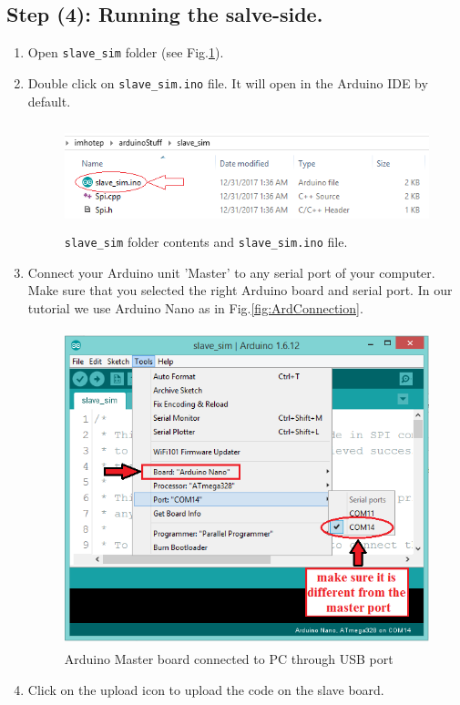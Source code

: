 \subsection{Step (4): Running the salve-side.}
\begin{enumerate}
\item Open \texttt{slave\_sim} folder (see Fig.\ref{fig:slaveFolder}).
\item Double click on \texttt{slave\_sim.ino} file. It will open in the Arduino IDE by default.
    \begin{figure}[h]
        \centering
        \includegraphics[width=12.75cm,height=3.08cm]{figures/image11}
        \caption{ \texttt{slave\_sim} folder contents and \texttt{slave\_sim.ino} file.}
                \label{fig:slaveFolder}
    \end{figure}
\item Connect your Arduino unit 'Master' to any serial port of your computer. 
Make sure that you selected the right Arduino board and serial port. In our 
tutorial we use Arduino Nano as in Fig.\ref{fig:ArdConnection}.
      \begin{figure}[h]
        \centering
        \includegraphics[width=11.21cm,height=9.19cm]{figures/image12}
        \caption{Arduino Master board connected to PC through USB port}
        \label{fig:ArdMasterConnection}
    \end{figure}
\item Click on the upload icon to upload the code on the slave board.
\end{enumerate}


